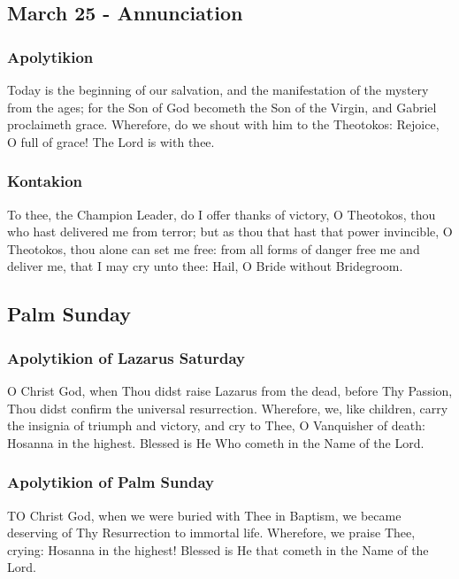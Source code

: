 \subsection{March 25 - Annunciation}

\subsubsection{Apolytikion}

 Today is the beginning of our salvation, and the manifestation of the mystery from the ages; for the Son of God becometh the Son of the Virgin, and Gabriel proclaimeth grace. Wherefore, do we shout with him to the Theotokos: Rejoice, O full of grace! The Lord is with thee.
\subsubsection{Kontakion}

 To thee, the Champion Leader, do I offer thanks of victory, O Theotokos, thou who hast delivered me from terror; but as thou that hast that power invincible, O Theotokos, thou alone can set me free: from all forms of danger free me and deliver me, that I may cry unto thee: Hail, O Bride without Bridegroom.

\subsection{Palm Sunday}

\subsubsection{Apolytikion of Lazarus Saturday}

 O Christ God, when Thou didst raise Lazarus from the dead, before Thy Passion, Thou didst confirm the universal resurrection. Wherefore, we, like children, carry the insignia of triumph and victory, and cry to Thee, O Vanquisher of death: Hosanna in the highest. Blessed is He Who cometh in the Name of the Lord.

\subsubsection{Apolytikion of Palm Sunday}

 TO Christ God, when we were buried with Thee in Baptism, we became deserving of Thy Resurrection to immortal life. Wherefore, we praise Thee, crying: Hosanna in the highest! Blessed is He that cometh in the Name of the Lord.

